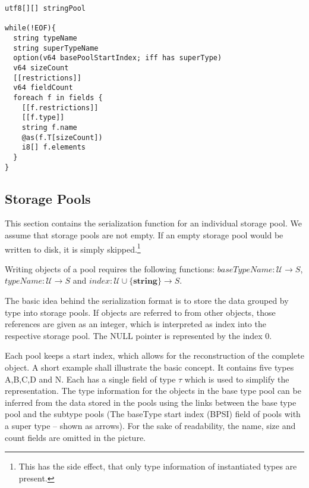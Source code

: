 \begin{verbatim}
utf8[][] stringPool

while(!EOF){
  string typeName
  string superTypeName
  option(v64 basePoolStartIndex; iff has superType)
  v64 sizeCount
  [[restrictions]]
  v64 fieldCount
  foreach f in fields {
    [[f.restrictions]]
    [[f.type]]
    string f.name
    @as(f.T[sizeCount])
    i8[] f.elements
  }
}
\end{verbatim}


\subsection{Storage Pools}

This section contains the serialization function for an individual storage pool. We assume that storage pools are not empty. If an empty storage pool would be written to disk, it is simply skipped.\footnote{This has the side effect, that only type information of instantiated types are present.}

Writing objects of a pool requires the following functions: $baseTypeName: \mathcal{U} → S$, $typeName: \mathcal{U} → S$ and $index: \mathcal{U}\cup\{\textbf{string}\} → S$.

The basic idea behind the serialization format is to store the data grouped by type into storage pools. If objects are referred to from other objects, those references are given as an integer, which is interpreted as index into the respective storage pool. The NULL pointer is represented by the index 0.

Each pool keeps a start index, which allows for the reconstruction of the complete object. A short example shall illustrate the basic concept. It contains five types A,B,C,D and N. Each has a single field of type $\tau$ which is used to simplify the representation. The type information for the objects in the base type pool can be inferred from the data stored in the pools using the links between the base type pool and the subtype pools (The \gls{baseType} start index (BPSI) field of pools with a super type -- shown as arrows). For the sake of readability, the name, size and count fields are omitted in the picture.


